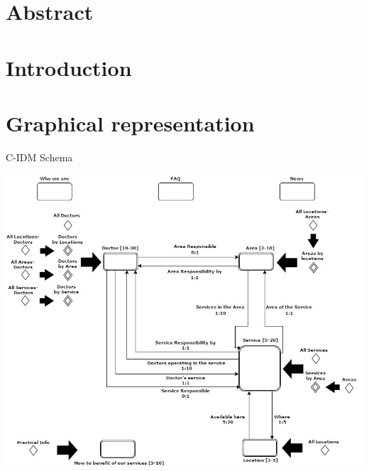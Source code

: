 \documentclass{../Common/Structure/doc_pdf}
\begin{document}
\titleToc

\chapter{Abstract}
\thispagestyle{fancy}

\chapter{Introduction}
\thispagestyle{fancy}

\chapter{Graphical representation}
\thispagestyle{fancy}

\centering C-IDM Schema
\vspace{1cm}
\begin{center}
	\includegraphics[width=\textwidth]{Clinic_C_IDM.jpg}
\end{center}

\newpage
\end{document}
